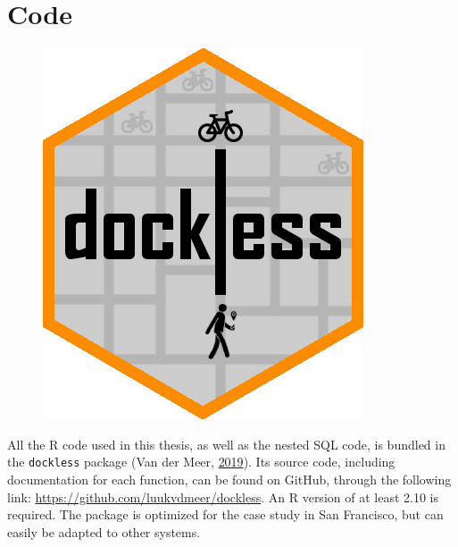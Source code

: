 \documentclass[12pt,oneside]{reedthesis}
\begin{document}
\chapter{Code}\label{aa}
\begin{figure}  
 \begin{center}
    \includegraphics[width=.3\textwidth]{Figures/hexagon.png}  
\end{center}
\end{figure}
All the R code used in this thesis, as well as the nested SQL code, is
bundled in the \texttt{dockless} package (Van der Meer,
\protect\hyperlink{ref-dockless}{2019}). Its source code, including
documentation for each function, can be found on GitHub, through the
following link: \url{https://github.com/luukvdmeer/dockless}. An R
version of at least 2.10 is required. The package is optimized for the
case study in San Francisco, but can easily be adapted to other systems.
\end{document}
